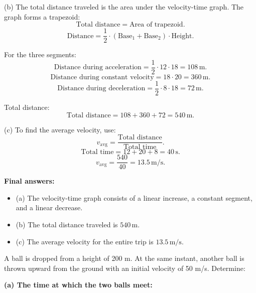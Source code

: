 \documentclass[addpoints]{exam}
\begin{document}
\begin{questions}
\begin{solution}[7cm]
(b) The total distance traveled is the area under the velocity-time graph. The graph forms a trapezoid:
\[
\text{Total distance} = \text{Area of trapezoid}.
\]
\[
\text{Distance} = \frac{1}{2} \cdot (\text{Base}_1 + \text{Base}_2) \cdot \text{Height}.
\]

For the three segments:
\[
\text{Distance during acceleration} = \frac{1}{2} \cdot 12 \cdot 18 = 108 \, \mathrm{m}.
\]
\[
\text{Distance during constant velocity} = 18 \cdot 20 = 360 \, \mathrm{m}.
\]
\[
\text{Distance during deceleration} = \frac{1}{2} \cdot 8 \cdot 18 = 72 \, \mathrm{m}.
\]

Total distance:
\[
\text{Total distance} = 108 + 360 + 72 = 540 \, \mathrm{m}.
\]

(c) To find the average velocity, use:
\[
v_{\text{avg}} = \frac{\text{Total distance}}{\text{Total time}}.
\]
\[
\text{Total time} = 12 + 20 + 8 = 40 \, \mathrm{s}.
\]
\[
v_{\text{avg}} = \frac{540}{40} = 13.5 \, \mathrm{m/s}.
\]

\textbf{Final answers:}
\begin{itemize}
    \item (a) The velocity-time graph consists of a linear increase, a constant segment, and a linear decrease.
    \item (b) The total distance traveled is \(540 \, \mathrm{m}\).
    \item (c) The average velocity for the entire trip is \(13.5 \, \mathrm{m/s}\).
\end{itemize}
\end{solution}



\question A ball is dropped from a height of 200 m. At the same instant, another ball is thrown upward from the ground with an initial velocity of 50 m/s. Determine:
\begin{solution}[12cm]
    \textbf{(a) The time at which the two balls meet:}


\end{solution}
\end{questions}
\end{document}
